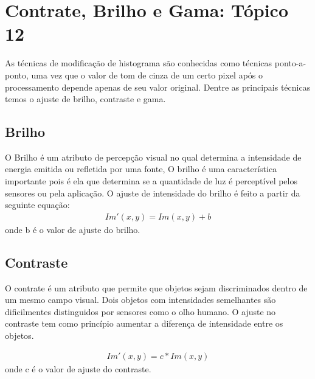 \documentclass[
	article,			%
	11pt,				%
	oneside,			%
	a4paper,			%
	english,			%
	brazil,				%
	sumario=tradicional
	]{abntex2}
\begin{document}
\section{Contrate, Brilho e Gama: Tópico 12}
As técnicas de modificação de histograma são conhecidas como técnicas ponto-a-ponto, uma
vez que o valor de tom de cinza de um certo pixel após o processamento depende apenas de seu
valor original. Dentre as principais técnicas temos o ajuste de brilho,
contraste e gama.

\subsection{Brilho}
O Brilho é um atributo de percepção visual no qual determina a intensidade de
energia emitida ou refletida por uma fonte, O brilho é uma característica
importante pois é ela que determina se a quantidade de luz é perceptível pelos
sensores ou pela aplicação. O ajuste de intensidade do brilho é feito a partir
da seguinte equação:
\begin{align}
Im'(x,y) = Im(x,y) + b
\end{align}
onde b é o valor de ajuste do brilho.


\subsection{Contraste}
O contrate é um atributo que permite que objetos sejam discriminados dentro de
um mesmo campo visual. Dois objetos com intensidades semelhantes são
dificilmentes distinguidos por sensores como o olho humano. O ajuste no
contraste tem como princípio aumentar a diferença de intensidade entre os
objetos.

\begin{align}
Im'(x,y) = c * Im(x,y)
\end{align}
onde c é o valor de ajuste do contraste.
\end{document}
